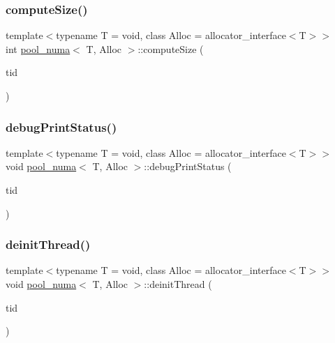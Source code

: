 \mbox{\label{classpool__numa_a192004323f02fb5713a08bf24ebdc11f}} 
\subsubsection{\texorpdfstring{compute\+Size()}{computeSize()}}
{\footnotesize\ttfamily template$<$typename T  = void, class Alloc  = allocator\+\_\+interface$<$\+T$>$$>$ \\
int \hyperlink{classpool__numa}{pool\+\_\+numa}$<$ T, Alloc $>$\+::compute\+Size (\begin{DoxyParamCaption}\item[{const int}]{tid }\end{DoxyParamCaption})\hspace{0.3cm}{\ttfamily [inline]}}

\mbox{\label{classpool__numa_a9acd9ed86c56c4a2edf2b260cfaeb396}} 
\subsubsection{\texorpdfstring{debug\+Print\+Status()}{debugPrintStatus()}}
{\footnotesize\ttfamily template$<$typename T  = void, class Alloc  = allocator\+\_\+interface$<$\+T$>$$>$ \\
void \hyperlink{classpool__numa}{pool\+\_\+numa}$<$ T, Alloc $>$\+::debug\+Print\+Status (\begin{DoxyParamCaption}\item[{const int}]{tid }\end{DoxyParamCaption})\hspace{0.3cm}{\ttfamily [inline]}}

\mbox{\label{classpool__numa_a10496f39e8c23755147d90c3b57618fa}} 
\subsubsection{\texorpdfstring{deinit\+Thread()}{deinitThread()}}
{\footnotesize\ttfamily template$<$typename T  = void, class Alloc  = allocator\+\_\+interface$<$\+T$>$$>$ \\
void \hyperlink{classpool__numa}{pool\+\_\+numa}$<$ T, Alloc $>$\+::deinit\+Thread (\begin{DoxyParamCaption}\item[{const int}]{tid }\end{DoxyParamCaption})\hspace{0.3cm}{\ttfamily [inline]}}

